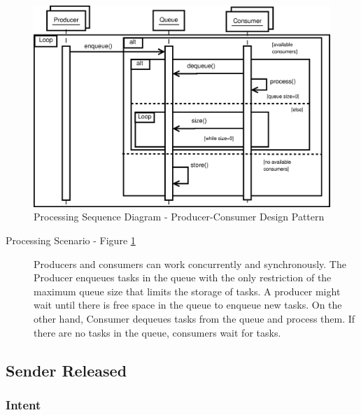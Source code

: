 \begin{figure}
	\centering
	\includegraphics*[width=1\textwidth, keepaspectratio=false]{fig/image13.eps}
	\caption{Processing Sequence Diagram - Producer-Consumer Design Pattern}
	\label{fig:seq_diagram_pc}
\end{figure}


\begin{description}
	
	\item[Processing Scenario - Figure \ref{fig:seq_diagram_pc}]
	
	Producers and consumers can work concurrently and synchronously. The Producer enqueues tasks in the queue with the only restriction of the maximum queue size that limits the storage of tasks. A producer might wait until there is free space in the queue to enqueue new tasks. On the other hand, Consumer dequeues tasks from the queue and process them. If there are no tasks in the queue, consumers wait for tasks.
\end{description}

\subsection{Sender Released}

\subsubsection{Intent}

